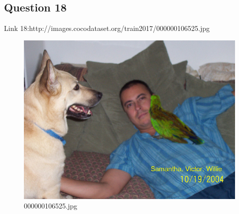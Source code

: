 \subsection*{Question 18}
Link 18:http://images.cocodataset.org/train2017/000000106525.jpg
    \begin{figure}[h]
        \centering
        \includegraphics[width=0.8\linewidth]{../image set/easy/000000106525.jpg}
        \caption{000000106525.jpg}
    \end{figure}
